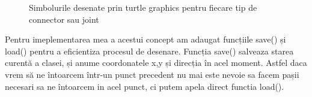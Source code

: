 \begin{figure}[H]
    \centering
    \qquad
    \caption{Simbolurile desenate prin turtle graphics pentru fiecare tip de connector sau joint}%
    \label{fig:example}%
\end{figure}


Pentru imeplementarea mea a acestui concept am adaugat funcțiile save() și load() pentru a eficientiza procesul de desenare.
Funcția save() salveaza starea curentă a clasei, și anume coordonatele x,y și direcția în acel moment. Astfel daca vrem să ne întoarcem 
într-un punct precedent nu mai este nevoie sa facem pașii necesari sa ne întoarcem in acel punct, ci putem apela direct functia load().\newline

